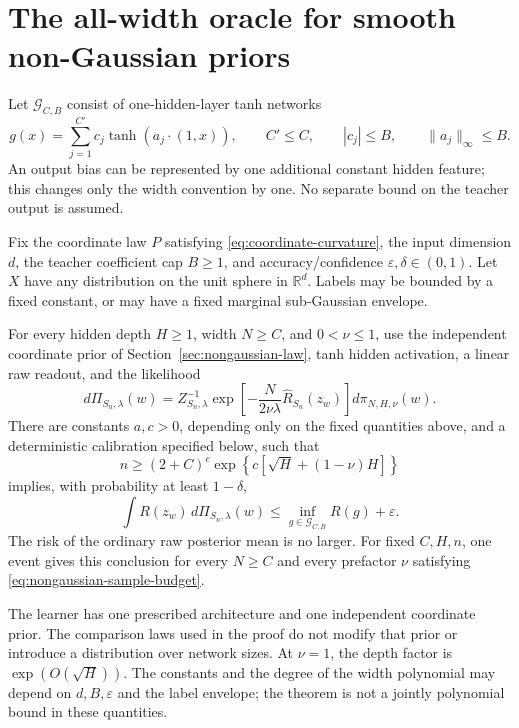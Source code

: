 \section{The all-width oracle for smooth non-Gaussian priors}
\label{sec:nongaussian-oracle}
Let $\mathcal G_{C,B}$ consist of one-hidden-layer tanh networks
\[
 g(x)=\sum_{j=1}^{C'} c_j\tanh(a_j\cdot(1,x)),
 \qquad C'\le C,\qquad
 |c_j|\le B,\qquad\|a_j\|_\infty\le B.
\]
An output bias can be represented by one additional constant hidden
feature; this changes only the width convention by one. No separate
bound on the teacher output is assumed.

\begin{theorem}
\label{thm:nongaussian-shallow-oracle}
Fix the coordinate law $P$ satisfying
\eqref{eq:coordinate-curvature}, the input dimension $d$, the teacher
coefficient cap $B\ge1$, and accuracy/confidence
$\varepsilon,\delta\in(0,1)$. Let $X$ have any distribution on the
unit sphere in $\mathbb R^d$. Labels may be bounded by a fixed
constant, or may have a fixed marginal sub-Gaussian envelope.

For every hidden depth $H\ge1$, width $N\ge C$, and $0<\nu\le1$,
use the independent coordinate prior of Section~\ref{sec:nongaussian-law},
tanh hidden activation, a linear raw readout, and the likelihood
\begin{equation}
 d\Pi_{S_n,\lambda}(w)=Z_{S_n,\lambda}^{-1}
 \exp\!\left[-\frac{N}{2\nu\lambda}
                  \widehat R_{S_n}(z_w)\right]d\pi_{N,H,\nu}(w).
 \label{eq:nongaussian-likelihood}
\end{equation}
There are constants $a,c>0$, depending only on the fixed quantities
above, and a deterministic calibration specified below, such that
\begin{equation}
 n\ge(2+C)^c\exp\!\left\{c[\sqrt H+(1-\nu)H]\right\}
 \label{eq:nongaussian-sample-budget}
\end{equation}
implies, with probability at least $1-\delta$,
\begin{equation}
 \int R(z_w)\,d\Pi_{S_n,\lambda}(w)
 \le\inf_{g\in\mathcal G_{C,B}}R(g)+\varepsilon.
 \label{eq:nongaussian-shallow-oracle}
\end{equation}
The risk of the ordinary raw posterior mean is no larger. For fixed
$C,H,n$, one event gives this conclusion for every $N\ge C$ and
every prefactor $\nu$ satisfying \eqref{eq:nongaussian-sample-budget}.

The learner has one prescribed architecture and one independent
coordinate prior. The comparison laws used in the proof do not
modify that prior or introduce a distribution over network sizes.
At $\nu=1$, the depth factor is $\exp(O(\sqrt H))$. The constants and
the degree of the width polynomial may depend on $d,B,\varepsilon$
and the label envelope; the theorem is not a jointly polynomial
bound in these quantities.
\end{theorem}

